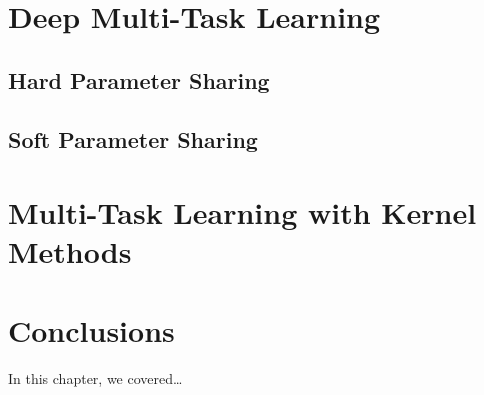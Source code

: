 \section{Deep Multi-Task Learning}
\subsection{Hard Parameter Sharing}
\subsection{Soft Parameter Sharing}





\section{Multi-Task Learning with Kernel Methods} %







\section{Conclusions}\label{sec-conclusions-2}

In this chapter, we covered\dots
